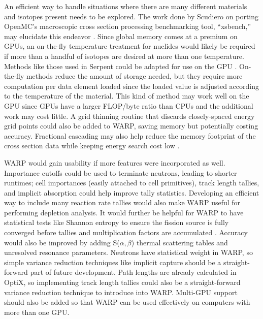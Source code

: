 \documentclass[preprint,12pt]{elsarticle}
\begin{document}
An efficient way to handle situations where there are many different materials and isotopes present needs to be explored.  The work done by Scudiero on porting OpenMC's macroscopic cross section processing benchmarking tool, ``xsbench,'' may elucidate this endeavor \cite{openmc,scudiero}.   Since global memory comes at a premium on GPUs, an on-the-fly temperature treatment for nuclides would likely be required if more than a handful of isotopes are desired at more than one temperature.  Methods like those used in Serpent could be adapted for use on the GPU \cite{serpent}.  On-the-fly methods reduce the amount of storage needed, but they require more computation per data element loaded since the loaded value is adjusted according to the temperature of the material.  This kind of method may work well on the GPU since GPUs have a larger FLOP/byte ratio than CPUs and the additional work may cost little.  A grid thinning routine that discards closely-spaced energy grid points could also be added to WARP, saving memory but potentially costing accuracy.  Fractional cascading may also help reduce the memory footprint of the cross section data while keeping energy search cost low \cite{Lund2015}. 

WARP would gain usability if more features were incorporated as well.  Importance cutoffs could be used to terminate neutrons, leading to shorter runtimes; cell importances (easily attached to cell primitives), track length tallies, and implicit absorption could help improve tally statistics.  Developing an efficient way to include many reaction rate tallies would also make WARP useful for performing depletion analysis.  It would further be helpful for WARP to have statistical tests like Shannon entropy to ensure the fission source is fully converged before tallies and multiplication factors are accumulated \cite{shannon}.  Accuracy would also be improved by adding S($\alpha,\beta$) thermal scattering tables and unresolved resonance parameters.  Neutrons have statistical weight in WARP, so simple variance reduction techniques like implicit capture should be a straight-forward part of future development.  Path lengths are already calculated in OptiX, so implementing track length tallies could also be a straight-forward variance reduction technique to introduce into WARP.  Multi-GPU support should also be added so that WARP can be used effectively on computers with more than one GPU.

\end{document}
